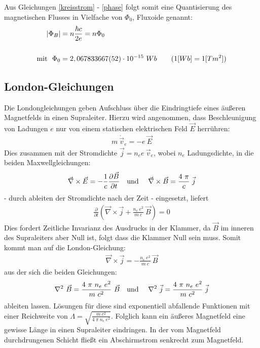 \documentclass[12pt]{article}
\begin{document}
Aus Gleichungen \ref{kreisstrom} - \ref{phase} folgt somit eine Quantisierung des magnetischen Flusses in Vielfache von $\Phi_0$, Fluxoide genannt:
\begin{align}
  \left|\Phi_B\right| &= n\frac{\hbar c}{2 e} = n \Phi_0 \\
\notag \\
\notag \textnormal{mit}~~\Phi_0 &= 2,067833667(52)\cdot 10^{-15} ~ Wb \quad \quad (1[Wb] = 1[Tm^2])
\end{align}

\newpage

\subsection{London-Gleichungen}
\label{london}
Die Londongleichungen geben Aufschluss über die Eindringtiefe eines äußeren Magnetfelds in einen Supraleiter.
Hierzu wird angenommen, dass Beschleunigung von Ladungen $e$ nur von einem statischen elektrischen Feld $\vec E$ herrühren:
\begin{align}
 m~\dot{\vec{v}}_e = - e~ \vec E
\end{align}
Dies zusammen mit der Stromdichte $\vec j = n_e e~\vec v_e$, wobei $n_e$ Ladungsdichte, in die beiden Maxwellgleichungen:
\begin{align}
 \vec\nabla \times \vec E = - \frac{1}{c}\frac{\partial\vec B}{\partial t} \textnormal{\quad und \quad} 
 \vec\nabla \times \vec B =  \frac{4~\pi}{c}~\vec j
\end{align}
- durch ableiten der Stromdichte nach der Zeit - eingesetzt, liefert
\begin{align}
 \frac{\partial}{\partial t} \left( \vec\nabla\times\vec j +  \frac{n_e~e^2}{m~c}~\vec B\right) = 0
\end{align}
Dies fordert Zeitliche Invarianz des Ausdrucks in der Klammer, da $\vec B$ im inneren des Supraleiters aber Null ist, folgt dass die Klammer Null sein muss. Somit kommt man auf die London-Gleichung:
\begin{align}
 \vec\nabla\times\vec j = -\frac{n_e~e^2}{m~c}~\vec B
\end{align}
aus der sich die beiden Gleichungen:
\begin{align}
 \nabla^2~\vec B = \frac{4~\pi~n_e~e^2}{m~c^2}~\vec B \textnormal{\quad und \quad} \nabla^2~\vec j = \frac{4~\pi~n_e~e^2}{m~c^2}~\vec j
\end{align}
ableiten lassen. Lösungen für diese sind exponentiell abfallende Funktionen mit einer Reichweite von $\Lambda =\sqrt{\frac{m~c^2}{4~\pi~n_e~e^2}}$. Folglich kann ein äußeres Magnetfeld eine gewisse Länge in einen Supraleiter eindringen. In der vom Magnetfeld durchdrungenen Schicht fließt ein Abschirmstrom senkrecht zum Magnetfeld.
\newpage
\end{document}

